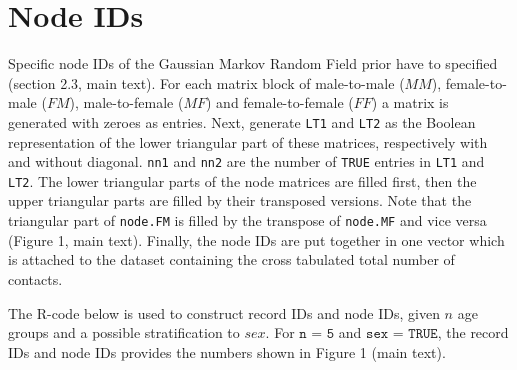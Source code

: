 \documentclass[aoas,preprint]{imsart}
\numberwithin{equation}{section}
\begin{document}
\section{Node IDs}

Specific node IDs of the Gaussian Markov Random Field prior have to specified (section 2.3, main text). For each matrix block of male-to-male ($\textit{MM}$), female-to-male ($\textit{FM}$), male-to-female ($\textit{MF}$) and female-to-female ($\textit{FF}$) a matrix is generated with zeroes as entries. Next, generate \texttt{LT1} and \texttt{LT2} as the Boolean representation of the lower triangular part of these matrices, respectively with and without diagonal. \texttt{nn1} and \texttt{nn2} are the number of \texttt{TRUE} entries in \texttt{LT1} and \texttt{LT2}. The lower triangular parts of the node matrices are filled first, then the upper triangular parts are filled by their transposed versions. Note that the triangular part of \texttt{node.FM} is filled by the transpose of \texttt{node.MF} and vice versa (Figure 1, main text). Finally, the node IDs are put together in one vector which is attached to the dataset containing the cross tabulated total number of contacts.

The R-code below is used to construct record IDs and node IDs, given $n$ age groups and a possible stratification to $sex$. For $\texttt{n = 5}$ and $\texttt{sex = TRUE}$, the record IDs and node IDs provides the numbers shown in Figure 1 (main text).
\end{document}
